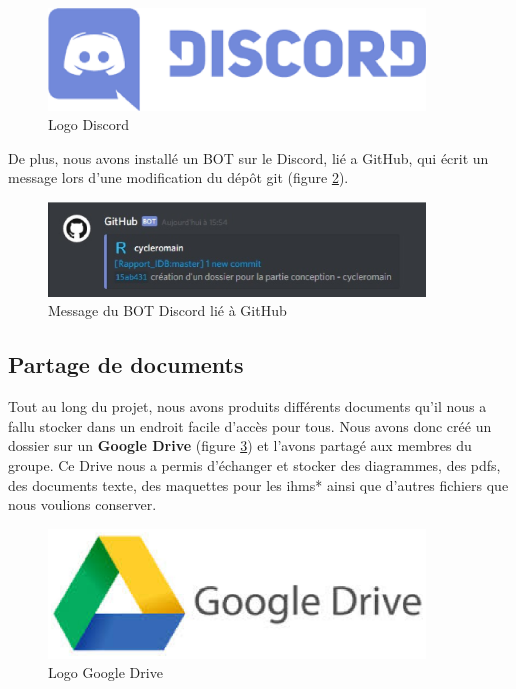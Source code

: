 \begin{figure}[!h]
\centering
\includegraphics[width=10cm]{./images/activite/discordLogo.eps}
\caption{Logo Discord}
\label{discord_logo}
\end{figure}

De plus, nous avons installé un BOT sur le Discord, lié a GitHub, qui écrit un message lors d'une modification du dép\^ot git (figure \ref{bot_discord}).

\begin{figure}[!h]
\centering
\includegraphics[width=10cm]{./images/activite/bot_discord.eps}
\caption{Message du BOT Discord lié à GitHub}
\label{bot_discord}
\end{figure}



\subsection{Partage de documents}
Tout au long du projet, nous avons produits différents documents qu'il nous a fallu stocker dans un endroit facile d'accès pour tous. Nous avons donc créé un dossier sur un \textbf{Google Drive} (figure \ref{googledrive_logo}) et l'avons partagé aux membres du groupe. Ce Drive nous a permis d'échanger et stocker des diagrammes, des pdfs, des documents texte, des maquettes pour les \glspl{ihm}* ainsi que d'autres fichiers que nous voulions conserver.

\begin{figure}[!h]
\centering
\includegraphics[width=10cm]{./images/activite/googleDriveLogo.eps}
\caption{Logo Google Drive}
\label{googledrive_logo}
\end{figure}



